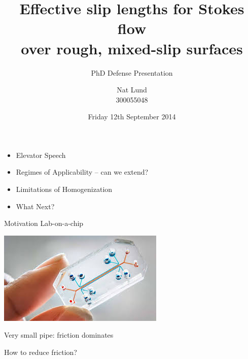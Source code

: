 \documentclass{beamer}
\title{Effective slip lengths for Stokes flow \\ over rough, mixed-slip surfaces}
\subtitle{PhD Defense Presentation}
\author{Nat Lund \\ 300055048}
\institute{Victoria University of Wellington}
\date{Friday 12th September 2014}
\begin{document}
\begin{frame}
\maketitle
\end{frame}


\begin{frame}
\begin{itemize}
\item Elevator Speech
\item Regimes of Applicability -- can we extend?
\item Limitations of Homogenization
\item What Next?
\end{itemize}

\end{frame}

\begin{frame}{Motivation}
Lab-on-a-chip

\begin{center}
\includegraphics[scale=0.5]{lab-on-chip.jpg}
\end{center}

Very small pipe: friction dominates

\vspace{1em}
How to reduce friction?
\end{frame}
\end{document}
